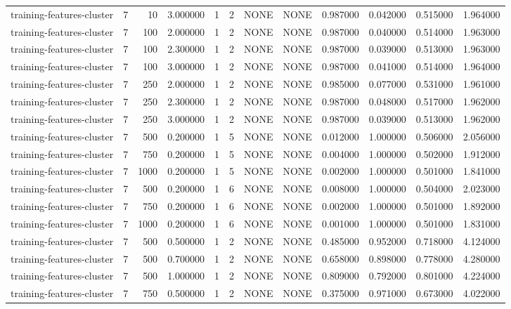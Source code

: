 \begin{tabular}{lrrrllllrrrr}
training-features-cluster & 7 & 10 & 3.000000 & 1 & 2 & NONE & NONE & 0.987000 & 0.042000 & 0.515000 & 1.964000 \\
training-features-cluster & 7 & 100 & 2.000000 & 1 & 2 & NONE & NONE & 0.987000 & 0.040000 & 0.514000 & 1.963000 \\
training-features-cluster & 7 & 100 & 2.300000 & 1 & 2 & NONE & NONE & 0.987000 & 0.039000 & 0.513000 & 1.963000 \\
training-features-cluster & 7 & 100 & 3.000000 & 1 & 2 & NONE & NONE & 0.987000 & 0.041000 & 0.514000 & 1.964000 \\
training-features-cluster & 7 & 250 & 2.000000 & 1 & 2 & NONE & NONE & 0.985000 & 0.077000 & 0.531000 & 1.961000 \\
training-features-cluster & 7 & 250 & 2.300000 & 1 & 2 & NONE & NONE & 0.987000 & 0.048000 & 0.517000 & 1.962000 \\
training-features-cluster & 7 & 250 & 3.000000 & 1 & 2 & NONE & NONE & 0.987000 & 0.039000 & 0.513000 & 1.962000 \\
training-features-cluster & 7 & 500 & 0.200000 & 1 & 5 & NONE & NONE & 0.012000 & 1.000000 & 0.506000 & 2.056000 \\
training-features-cluster & 7 & 750 & 0.200000 & 1 & 5 & NONE & NONE & 0.004000 & 1.000000 & 0.502000 & 1.912000 \\
training-features-cluster & 7 & 1000 & 0.200000 & 1 & 5 & NONE & NONE & 0.002000 & 1.000000 & 0.501000 & 1.841000 \\
training-features-cluster & 7 & 500 & 0.200000 & 1 & 6 & NONE & NONE & 0.008000 & 1.000000 & 0.504000 & 2.023000 \\
training-features-cluster & 7 & 750 & 0.200000 & 1 & 6 & NONE & NONE & 0.002000 & 1.000000 & 0.501000 & 1.892000 \\
training-features-cluster & 7 & 1000 & 0.200000 & 1 & 6 & NONE & NONE & 0.001000 & 1.000000 & 0.501000 & 1.831000 \\
training-features-cluster & 7 & 500 & 0.500000 & 1 & 2 & NONE & NONE & 0.485000 & 0.952000 & 0.718000 & 4.124000 \\
training-features-cluster & 7 & 500 & 0.700000 & 1 & 2 & NONE & NONE & 0.658000 & 0.898000 & 0.778000 & 4.280000 \\
training-features-cluster & 7 & 500 & 1.000000 & 1 & 2 & NONE & NONE & 0.809000 & 0.792000 & 0.801000 & 4.224000 \\
training-features-cluster & 7 & 750 & 0.500000 & 1 & 2 & NONE & NONE & 0.375000 & 0.971000 & 0.673000 & 4.022000 \\

\end{tabular}

